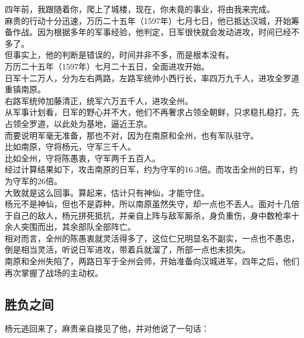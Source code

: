 \begin{multicols}{\theparacolNo}
四年前，我跟随着你，爬上了城楼，现在，你未竟的事业，将由我来完成。\\

麻贵的行动十分迅速，万历二十五年（1597年）七月七日，他已抵达汉城，开始筹备作战。因为根据多年的军事经验，他判定，日军很快就会发动进攻，时间已经不多了。\\

但事实上，他的判断是错误的，时间并非不多，而是根本没有。\\

万历二十五年（1597年）七月二十五日，全面进攻开始。\\

日军十二万人，分为左右两路，左路军统帅小西行长，率四万九千人，进攻全罗道重镇南原。\\

右路军统帅加藤清正，统军六万五千人，进攻全州。\\

从军事计划看，日军的野心并不大，他们不再奢求占领全朝鲜，只求稳扎稳打，先占领全罗道，以此处为基地，逼近王京。\\

而要说明军毫无准备，那也不对，因为在南原和全州，也有军队驻守。\\

比如南原，守将杨元，守军三千人。\\

比如全州，守将陈愚衷，守军两千五百人。\\

经过计算结果如下，攻击南原的日军，约为守军的16.3倍。而攻击全州的日军，约为守军的26倍。\\

大致就是这么回事。算起来，估计只有神仙，才能守住。\\

杨元不是神仙，但也不是孬种，所以南原虽然失守，却一点也不丢人。面对十几倍于自己的敌人，杨元拼死抵抗，并亲自上阵与敌军厮杀，身负重伤，身中数枪率十余人突围而出，其余部队全部阵亡。\\

相对而言，全州的陈愚衷就灵活得多了，这位仁兄明显名不副实，一点也不愚忠，倒是相当灵活，听说日军进攻，带着兵就溜了，所部一点也未损失。\\

南原和全州失陷了，两路日军于全州会师，开始准备向汉城进军，四年之后，他们再次掌握了战场的主动权。\\

\subsection{胜负之间}
杨元逃回来了，麻贵亲自接见了他，并对他说了一句话：\\


\end{multicols}
